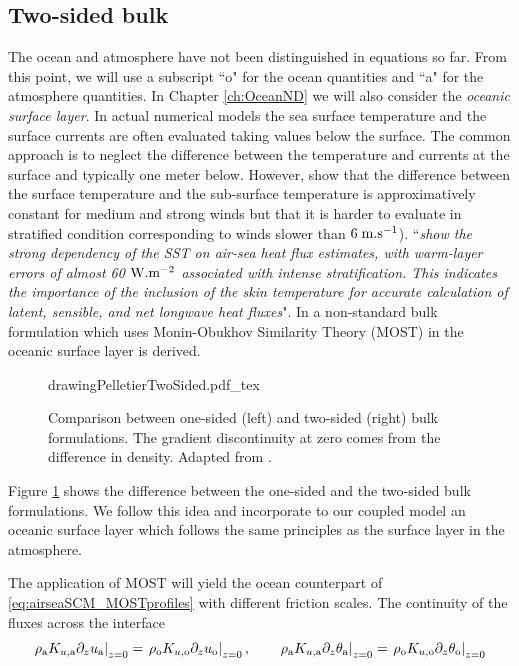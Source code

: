 \subsection{Two-sided bulk}
\label{sec:airseaSCM_twoSided}
The ocean and atmosphere have not been distinguished in equations
so far. From this point, we will use a subscript ``o" for the ocean
quantities and ``a" for the atmosphere quantities.
In Chapter \ref{ch:OceanND} we will also consider the
\textit{oceanic surface layer}.
In actual numerical models the sea surface temperature and the
surface currents are often
evaluated taking values below the surface. The common approach is
to neglect the difference between the temperature and currents
at the surface and typically one meter below. However,
\citep{donlon_toward_2002} show that
the difference between
the surface temperature and the sub-surface temperature is
approximatively constant for medium and strong winds but that 
it is harder to evaluate in stratified condition corresponding
to winds slower than $6 \; {\rm m}.{\rm s}^{-1}$).
\citep{ward_near-surface_2006}
``\textit{show the strong dependency of the SST on air-sea heat
flux estimates, with warm-layer errors of almost
60 ${\rm W}.{\rm m}^{-2}$ associated with intense stratification. This indicates
the importance of the inclusion of the skin temperature for
accurate calculation of latent, sensible, and net longwave
heat fluxes}".
In \citep{pelletier_two-sided_2021} a non-standard bulk formulation
which uses Monin-Obukhov Similarity Theory (MOST) in the oceanic
surface layer is derived.
\begin{figure}[h!]
	\centering
	{drawingPelletierTwoSided.pdf_tex}
	\caption{Comparison between one-sided (left) and two-sided
	(right) bulk formulations. The gradient discontinuity at zero
	comes from the difference in density.
	Adapted from \citep{pelletier_two-sided_2021}.
	}
	\label{fig:airseaSCM_OSTSBulk_drawing}
\end{figure}
Figure \ref{fig:airseaSCM_OSTSBulk_drawing} shows the difference
between the one-sided and the two-sided bulk formulations.
We follow this idea and incorporate to our coupled model an
oceanic surface layer which follows the same principles as
the surface layer in the atmosphere.
\par
The application of MOST will yield the ocean counterpart
of \eqref{eq:airseaSCM_MOSTprofiles} with different
friction scales. The continuity of the fluxes across the interface
\begin{equation}
	\left.\rho_{\rm a} K_{u,{\rm a}}
	\partial_z u_{\rm a}\right|_{z=0} = 
	\left.\rho_{\rm o} K_{u,{\rm o}}
	\partial_z u_{\rm o}\right|_{z=0}, ~~~~~~
	\left.\rho_{\rm a} K_{u,{\rm a}}
	\partial_z \theta_{\rm a}\right|_{z=0} = 
	\left.\rho_{\rm o} K_{u,{\rm o}}
	\partial_z \theta_{\rm o}\right|_{z=0}
\end{equation}
